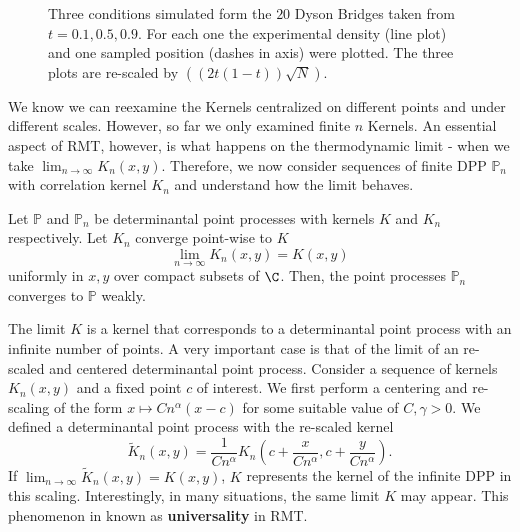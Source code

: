 \begin{exemplo}
\begin{figure}[H]
 		\begin{subfigure}{0.3\textwidth}
 			\centering
 		\end{subfigure} \hfill
 		\caption{Three conditions simulated form the $20$ Dyson Bridges taken from $t = 0.1, 0.5, 0.9$. For each one the experimental density (line plot) and one sampled position (dashes in axis) were plotted. The three plots are re-scaled by $((2t(1-t))\sqrt{N}).$}
 		\label{Figure: scalings bridges}
 	\end{figure}
 \end{exemplo}
 
 We know we can reexamine the Kernels centralized on different points and under different scales. However, so far we only examined finite $n$ Kernels. An essential aspect of RMT, however, is what happens on the thermodynamic limit - when we take $\lim_{n \rightarrow \infty} K_n(x, y)$. Therefore, we now consider sequences of finite DPP $\mathbb{P}_n$ with correlation kernel $K_n$ and understand how the limit behaves. 
 \begin{proposicao} \cite{ManuelaGirottiPhD}
 	Let $\mathbb{P}$ and $\mathbb{P}_n$ be determinantal point processes with kernels $K$ and $K_n$ respectively. Let $K_n$ converge point-wise to $K$
 	\begin{equation}
 		\lim_{n \rightarrow \infty} K_n(x, y) = K(x, y)
 	\end{equation}
 	uniformly in $x, y$ over compact subsets of $\C$. Then, the point processes $\mathbb{P}_n$ converges to $\mathbb{P}$ weakly. 
 \end{proposicao}
 
 The limit $K$ is a kernel that corresponds to a determinantal point process with an infinite number of points. A very important case is that of the limit of an re-scaled and centered determinantal point process. Consider a sequence of kernels $K_n(x,y)$ and a fixed point $c$ of interest. We first perform a centering and re-scaling of the form
$
 	x \mapsto Cn^\alpha (x - c)
$
 for some suitable value of $C, \gamma > 0$. We defined a determinantal point process with the re-scaled kernel
 \begin{equation}
  \tilde{K}_n(x, y) = \frac{1}{C n^\alpha} K_n \left( c + \frac{x}{C n^\alpha}, c + \frac{y}{C n^\alpha} \right).
 \end{equation}
 If $\lim_{n \rightarrow \infty} \tilde{K}_n(x,y) = K(x, y)$, $K$ represents the kernel of the infinite DPP in this scaling. Interestingly, in many situations, the same limit $K$ may appear. This phenomenon in known as \textbf{universality} in RMT. 
 
